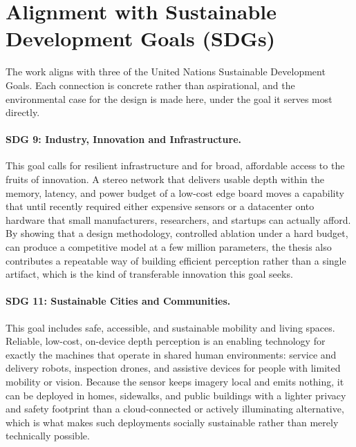 \FloatBarrier
\section{Alignment with Sustainable Development Goals (SDGs)}
\label{sec:sdg}
The work aligns with three of the United Nations Sustainable Development
Goals. Each connection is concrete rather than aspirational, and the
environmental case for the design is made here, under the goal it serves
most directly.

\paragraph{SDG 9: Industry, Innovation and Infrastructure.}
This goal calls for resilient infrastructure and for broad, affordable
access to the fruits of innovation. A stereo network that delivers usable
depth within the memory, latency, and power budget of a low-cost edge
board moves a capability that until recently required either expensive
sensors or a datacenter onto hardware that small manufacturers,
researchers, and startups can actually afford. By showing that a design
methodology, controlled ablation under a hard budget, can produce a
competitive model at a few million parameters, the thesis also
contributes a repeatable way of building efficient perception rather than
a single artifact, which is the kind of transferable innovation this goal
seeks.

\paragraph{SDG 11: Sustainable Cities and Communities.}
This goal includes safe, accessible, and sustainable mobility and living
spaces. Reliable, low-cost, on-device depth perception is an enabling
technology for exactly the machines that operate in shared human
environments: service and delivery robots, inspection drones, and
assistive devices for people with limited mobility or vision. Because the
sensor keeps imagery local and emits nothing, it can be deployed in homes,
sidewalks, and public buildings with a lighter privacy and safety
footprint than a cloud-connected or actively illuminating alternative,
which is what makes such deployments socially sustainable rather than
merely technically possible.

